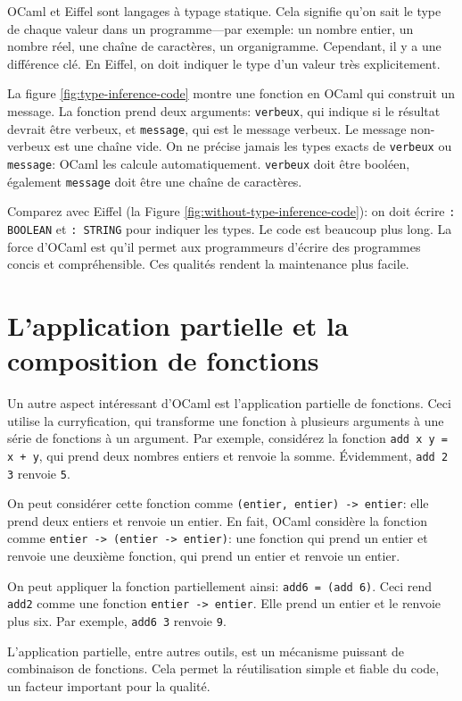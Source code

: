 \documentclass[french]{report}
\begin{document}
OCaml et Eiffel sont langages à typage statique. Cela signifie qu'on sait le type de chaque valeur dans un programme---par exemple: un nombre entier, un nombre réel, une chaîne de caractères, un organigramme. Cependant, il y a une différence clé. En Eiffel, on doit indiquer le type d'un valeur très explicitement.

La figure \ref{fig:type-inference-code} montre une fonction en OCaml qui construit un message. La fonction prend deux arguments: \texttt{verbeux}, qui indique si le résultat devrait être verbeux, et \texttt{message}, qui est le message verbeux. Le message non-verbeux est une chaîne vide. On ne précise jamais les types exacts de \texttt{verbeux} ou \texttt{message}: OCaml les calcule automatiquement. \texttt{verbeux} doit être booléen, également \texttt{message} doit être une chaîne de caractères.

Comparez avec Eiffel (la Figure \ref{fig:without-type-inference-code}): on doit écrire \texttt{: BOOLEAN} et \texttt{: STRING} pour indiquer les types. Le code est beaucoup plus long. La force d'OCaml est qu'il permet aux programmeurs d'écrire des programmes concis et compréhensible. Ces qualités rendent la maintenance plus facile.

\section{L'application partielle et la composition de fonctions}

Un autre aspect intéressant d'OCaml est l'application partielle de fonctions. Ceci utilise la curryfication, qui transforme une fonction à plusieurs arguments à une série de fonctions à un argument. Par exemple, considérez la fonction \texttt{add x y = x + y}, qui prend deux nombres entiers et renvoie la somme. Évidemment, \texttt{add 2 3} renvoie \texttt{5}.

On peut considérer cette fonction comme \texttt{(entier, entier) -> entier}: elle prend deux entiers et renvoie un entier. En fait, OCaml considère la fonction comme \texttt{entier -> (entier -> entier)}: une fonction qui prend un entier et renvoie une deuxième fonction, qui prend un entier et renvoie un entier. 

On peut appliquer la fonction partiellement ainsi: \texttt{add6 = (add 6)}. Ceci rend \texttt{add2} comme une fonction \texttt{entier -> entier}. Elle prend un entier et le renvoie plus six. Par exemple, \texttt{add6 3} renvoie \texttt{9}.

L'application partielle, entre autres outils, est un mécanisme puissant de combinaison de fonctions. Cela permet la réutilisation simple et fiable du code, un facteur important pour la qualité.
\end{document}
